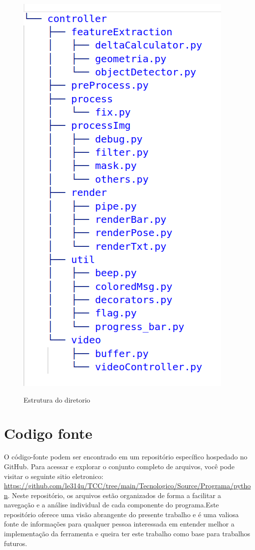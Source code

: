 \begin{figure}[H]
	\centering
    \caption{Estrutura do diretorio }
	\includegraphics[scale=0.6]{figuras/diretorios/controller.png}
	\label{fig:controller}
\end{figure}



\section[Codigo fonte]{Codigo fonte}

O código-fonte podem ser encontrado em um repositório específico hospedado no GitHub. Para acessar e explorar o conjunto completo de arquivos, você pode visitar o seguinte sitio eletronico: \url{https://github.com/le314u/TCC/tree/main/Tecnologico/Source/Programa/python}. Neste repositório, os arquivos estão organizados de forma a facilitar a navegação e a análise individual de cada componente do programa.Este repositório oferece uma visão abrangente do presente trabalho e é uma valiosa fonte de informações para qualquer pessoa interessada em entender melhor a implementação da ferramenta e queira ter este trabalho como base para trabalhos futuros.


